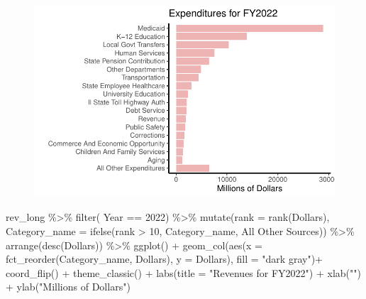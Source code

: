 \documentclass[
  letterpaper,
  DIV=11,
  numbers=noendperiod]{scrreport}
\newenvironment{Shaded}{\begin{snugshade}}{\end{snugshade}}
\newcommand{\AttributeTok}[1]{\textcolor[rgb]{0.40,0.45,0.13}{#1}}
\newcommand{\DecValTok}[1]{\textcolor[rgb]{0.68,0.00,0.00}{#1}}
\newcommand{\FunctionTok}[1]{\textcolor[rgb]{0.28,0.35,0.67}{#1}}
\newcommand{\NormalTok}[1]{\textcolor[rgb]{0.00,0.23,0.31}{#1}}
\newcommand{\SpecialCharTok}[1]{\textcolor[rgb]{0.37,0.37,0.37}{#1}}
\newcommand{\StringTok}[1]{\textcolor[rgb]{0.13,0.47,0.30}{#1}}
\begin{document}
\begin{figure}[H]

{\centering \includegraphics{./Everything_files/figure-pdf/unnamed-chunk-10-1.pdf}

}

\end{figure}

\begin{Shaded}
\begin{Highlighting}[]
\NormalTok{rev\_long }\SpecialCharTok{\%\textgreater{}\%}
  \FunctionTok{filter}\NormalTok{( Year }\SpecialCharTok{==} \DecValTok{2022}\NormalTok{) }\SpecialCharTok{\%\textgreater{}\%}
  \FunctionTok{mutate}\NormalTok{(}\AttributeTok{rank =} \FunctionTok{rank}\NormalTok{(Dollars),}
        \AttributeTok{Category\_name =} \FunctionTok{ifelse}\NormalTok{(rank }\SpecialCharTok{\textgreater{}} \DecValTok{10}\NormalTok{, Category\_name, }\StringTok{\textquotesingle{}All Other Sources\textquotesingle{}}\NormalTok{)) }\SpecialCharTok{\%\textgreater{}\%}
  \FunctionTok{arrange}\NormalTok{(}\FunctionTok{desc}\NormalTok{(Dollars)) }\SpecialCharTok{\%\textgreater{}\%}
  \FunctionTok{ggplot}\NormalTok{() }\SpecialCharTok{+} 
  \FunctionTok{geom\_col}\NormalTok{(}\FunctionTok{aes}\NormalTok{(}\AttributeTok{x =} \FunctionTok{fct\_reorder}\NormalTok{(Category\_name, }\StringTok{\textasciigrave{}}\AttributeTok{Dollars}\StringTok{\textasciigrave{}}\NormalTok{), }\AttributeTok{y =} \StringTok{\textasciigrave{}}\AttributeTok{Dollars}\StringTok{\textasciigrave{}}\NormalTok{), }\AttributeTok{fill =} \StringTok{"dark gray"}\NormalTok{)}\SpecialCharTok{+} 
  \FunctionTok{coord\_flip}\NormalTok{() }\SpecialCharTok{+}
      \FunctionTok{theme\_classic}\NormalTok{() }\SpecialCharTok{+}
    \FunctionTok{labs}\NormalTok{(}\AttributeTok{title =} \StringTok{"Revenues for FY2022"}\NormalTok{) }\SpecialCharTok{+}
    \FunctionTok{xlab}\NormalTok{(}\StringTok{""}\NormalTok{) }\SpecialCharTok{+}
  \FunctionTok{ylab}\NormalTok{(}\StringTok{"Millions of Dollars"}\NormalTok{)}
\end{Highlighting}
\end{Shaded}
\end{document}
